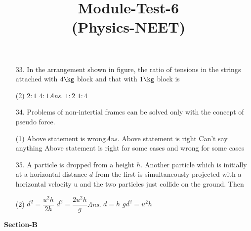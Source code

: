\documentclass{article}
\title{Module-Test-6\\(Physics-NEET)}
\newcommand{\ans}{\textcolor{red!95}{\textit{\quad Ans.}}}
\begin{document}
\maketitle

\pagebreak

\begin{enumerate}
\item[33.] In the arrangement shown in figure, the ratio of tensions in the strings attached with $4 \kg$ block and that with $1 \kg$ block is
\begin{center}
\end{center} 
\begin{tasks}(2)
	\task $2:1$
	\task $4:1$\ans
	\task $1:2$
	\task $1:4$
\end{tasks}

\item[34.] Problems of non-intertial frames can be solved only with the concept of pseudo force.
\begin{tasks}(1)
	\task Above statement is wrong\ans
	\task Above statement is right
	\task Can't say anything
	\task Above statement is right for some cases and wrong for some cases
\end{tasks}

\item[35.] A particle is dropped from a height $h$. Another particle which is initially at a horizontal distance $d$ from the first is simultaneously projected with a horizontal velocity u and the two particles just collide on the ground. Then   
\begin{tasks}(2)
	\task $d^2=\dfrac{u^2h}{2h}$
	\task $d^2=\dfrac{2u^2h}{g}$\ans
	\task $d=h$
	\task $gd^2=u^2h$
\end{tasks}

\end{enumerate}

\begin{center}
\textbf{Section-B}
\end{center}
\end{document}
